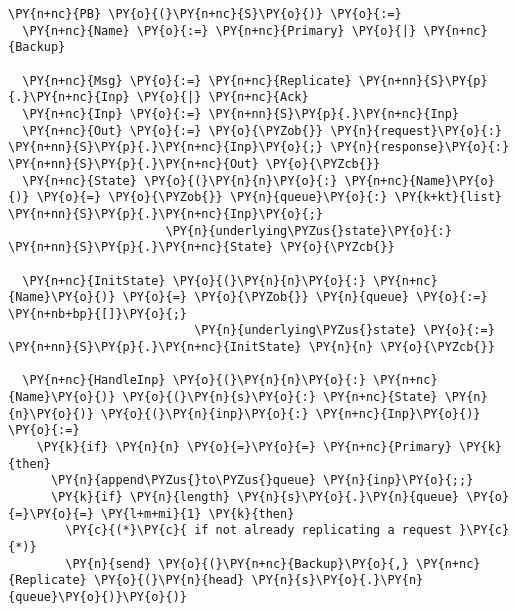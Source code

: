\begin{Verbatim}[commandchars=\\\{\},codes={\catcode`\$=3\catcode`\^=7\catcode`\_=8}]
\PY{n+nc}{PB} \PY{o}{(}\PY{n+nc}{S}\PY{o}{)} \PY{o}{:=}
  \PY{n+nc}{Name} \PY{o}{:=} \PY{n+nc}{Primary} \PY{o}{|} \PY{n+nc}{Backup}

  \PY{n+nc}{Msg} \PY{o}{:=} \PY{n+nc}{Replicate} \PY{n+nn}{S}\PY{p}{.}\PY{n+nc}{Inp} \PY{o}{|} \PY{n+nc}{Ack}
  \PY{n+nc}{Inp} \PY{o}{:=} \PY{n+nn}{S}\PY{p}{.}\PY{n+nc}{Inp}
  \PY{n+nc}{Out} \PY{o}{:=} \PY{o}{\PYZob{}} \PY{n}{request}\PY{o}{:} \PY{n+nn}{S}\PY{p}{.}\PY{n+nc}{Inp}\PY{o}{;} \PY{n}{response}\PY{o}{:} \PY{n+nn}{S}\PY{p}{.}\PY{n+nc}{Out} \PY{o}{\PYZcb{}}
  \PY{n+nc}{State} \PY{o}{(}\PY{n}{n}\PY{o}{:} \PY{n+nc}{Name}\PY{o}{)} \PY{o}{=} \PY{o}{\PYZob{}} \PY{n}{queue}\PY{o}{:} \PY{k+kt}{list} \PY{n+nn}{S}\PY{p}{.}\PY{n+nc}{Inp}\PY{o}{;}
                      \PY{n}{underlying\PYZus{}state}\PY{o}{:} \PY{n+nn}{S}\PY{p}{.}\PY{n+nc}{State} \PY{o}{\PYZcb{}}

  \PY{n+nc}{InitState} \PY{o}{(}\PY{n}{n}\PY{o}{:} \PY{n+nc}{Name}\PY{o}{)} \PY{o}{=} \PY{o}{\PYZob{}} \PY{n}{queue} \PY{o}{:=} \PY{n+nb+bp}{[]}\PY{o}{;}
                          \PY{n}{underlying\PYZus{}state} \PY{o}{:=} \PY{n+nn}{S}\PY{p}{.}\PY{n+nc}{InitState} \PY{n}{n} \PY{o}{\PYZcb{}}

  \PY{n+nc}{HandleInp} \PY{o}{(}\PY{n}{n}\PY{o}{:} \PY{n+nc}{Name}\PY{o}{)} \PY{o}{(}\PY{n}{s}\PY{o}{:} \PY{n+nc}{State} \PY{n}{n}\PY{o}{)} \PY{o}{(}\PY{n}{inp}\PY{o}{:} \PY{n+nc}{Inp}\PY{o}{)} \PY{o}{:=}
    \PY{k}{if} \PY{n}{n} \PY{o}{=}\PY{o}{=} \PY{n+nc}{Primary} \PY{k}{then}
      \PY{n}{append\PYZus{}to\PYZus{}queue} \PY{n}{inp}\PY{o}{;;}
      \PY{k}{if} \PY{n}{length} \PY{n}{s}\PY{o}{.}\PY{n}{queue} \PY{o}{=}\PY{o}{=} \PY{l+m+mi}{1} \PY{k}{then}
        \PY{c}{(*}\PY{c}{ if not already replicating a request }\PY{c}{*)}
        \PY{n}{send} \PY{o}{(}\PY{n+nc}{Backup}\PY{o}{,} \PY{n+nc}{Replicate} \PY{o}{(}\PY{n}{head} \PY{n}{s}\PY{o}{.}\PY{n}{queue}\PY{o}{)}\PY{o}{)}
                          

\end{Verbatim}
